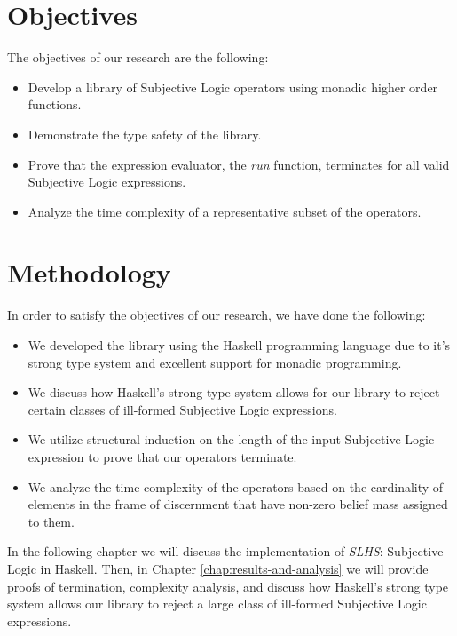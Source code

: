 \documentclass[thesis.tex]{subfiles}
\begin{document}
\section{Objectives}

The objectives of our research are the following:

\begin{itemize}
  \item Develop a library of Subjective Logic operators using monadic higher order functions.
  \item Demonstrate the type safety of the library.
  \item Prove that the expression evaluator, the \emph{run} function, terminates for all valid Subjective Logic expressions.
  \item Analyze the time complexity of a representative subset of the operators.
\end{itemize}




\section{Methodology}

In order to satisfy the objectives of our research, we have done the following:

\begin{itemize}
  \item We developed the library using the Haskell programming language due to it's strong type
system and excellent support for monadic programming.
  \item We discuss how Haskell's strong type system allows for our library to reject certain
classes of ill-formed Subjective Logic expressions.
  \item We utilize structural induction on the length of the input Subjective Logic expression to prove that
our operators terminate.
  \item We analyze the time complexity of the operators based on the cardinality of elements in the
frame of discernment that have non-zero belief mass assigned to them.
\end{itemize}

In the following chapter we will discuss the implementation of \emph{SLHS}: Subjective Logic in Haskell.
Then, in Chapter \ref{chap:results-and-analysis} we will provide proofs of termination, complexity
analysis, and discuss how Haskell's strong type system allows our library to reject a large class of ill-formed
Subjective Logic expressions.
\end{document}
